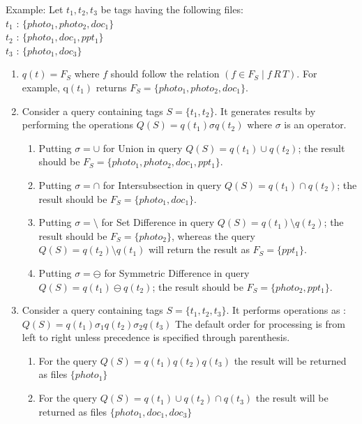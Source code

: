 Example:
\noindent Let $t_{1}, t_{2}, t_{3}$ be tags having the following files: \\
\indent $t_{1}$ : $\{photo_{1},photo_{2},doc_{1}\}$  \\
\indent $t_{2}$ : $\{photo_{1},doc_{1}, ppt_{1}\}$  \\
\indent $t_{3}$ : $\{photo_{1},doc_{3}\}$ 
\begin{enumerate}
\item $q(t) = F_{S}$ where $f$ should follow the relation $(f \in F_S \mid f \, R \, T)$. 
For example, q$(t_{1})$ returns $F_S = \{photo_{1},photo_{2},doc_{1}\}$.
\item Consider a query containing tags $S = \{t_{1}, t_{2}\}$. 
It generates results by performing the operations $Q(S) = q(t_{1})\sigma q(t_{2})$
where $\sigma $ is an operator.
\begin{enumerate}
\item Putting $\sigma = \cup$ for Union in query $Q(S) = q(t_{1})\cup q(t_{2})$; the result should be $F_S = \{photo_1, photo_2, doc_1, ppt_1\}$. 	
\item Putting $\sigma = \cap$ for Intersubsection in query $Q(S) = q(t_{1})\cap q(t_{2})$; the result should be $F_S = \{photo_1, doc_1\}$.
\item Putting $\sigma = \setminus$ for Set Difference in query $Q(S) = q(t_{1})\setminus q(t_{2})$; the result should be $F_S = \{photo_2\}$, whereas the query $Q(S) = q(t_{2}) \setminus q(t_{1})$ will return the result as $F_S = \{ppt_1\}$.
\item Putting $\sigma = \ominus$ for Symmetric Difference in query $Q(S) = q(t_{1})\ominus q(t_{2})$; the result should be $F_S = \{photo_2, ppt_1\}$.
\end{enumerate}

\item Consider a query containing tags $S = \{t_{1}, t_{2}, t_{3}\}$.
It performs operations as : $Q(S) = q(t_{1})\sigma_{1} q(t_{2})\sigma_{2} q(t_{3})$
The default order for processing is from left to right unless precedence is specified through parenthesis.

\begin{enumerate}
\item For the query $Q(S) = q(t_{1}) q(t_{2}) q(t_{3})$ the result will be returned as files $\{photo_{1}\}$
\item For the query $Q(S) = q(t_{1}) \cup q(t_{2}) \cap q(t_{3})$ the result will be returned as files $\{photo_{1}, doc_{1}, doc_{3}\}$
\end{enumerate}
\end{enumerate}

